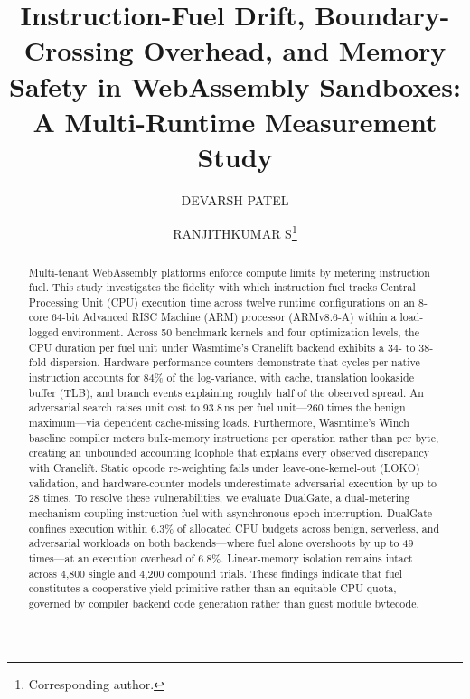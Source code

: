 \documentclass{ws-jcsc}
\begin{document}

\catchline{}{}{}{}{}

\title{Instruction-Fuel Drift, Boundary-Crossing Overhead, and Memory Safety in WebAssembly Sandboxes: A Multi-Runtime Measurement Study}

\author{DEVARSH PATEL}
\address{School of Computer Science and Engineering (SCOPE), Vellore Institute of Technology (VIT)\
Vellore, Tamil Nadu, 632014, India\
}

\author{RANJITHKUMAR S\footnote{Corresponding author.}}
\address{School of Computer Science and Engineering (SCOPE), Vellore Institute of Technology (VIT)\
Vellore, Tamil Nadu, 632014, India\
}

\maketitle

\begin{history}
\end{history}

\begin{abstract}
Multi-tenant WebAssembly platforms enforce compute limits by metering instruction fuel. This study investigates the fidelity with which instruction fuel tracks Central Processing Unit (CPU) execution time across twelve runtime configurations on an 8-core 64-bit Advanced RISC Machine (ARM) processor (ARMv8.6-A) within a load-logged environment. Across 50 benchmark kernels and four optimization levels, the CPU duration per fuel unit under Wasmtime's Cranelift backend exhibits a 34- to 38-fold dispersion. Hardware performance counters demonstrate that cycles per native instruction accounts for 84\% of the log-variance, with cache, translation lookaside buffer (TLB), and branch events explaining roughly half of the observed spread. An adversarial search raises unit cost to 93.8\,ns per fuel unit---260 times the benign maximum---via dependent cache-missing loads. Furthermore, Wasmtime's Winch baseline compiler meters bulk-memory instructions per operation rather than per byte, creating an unbounded accounting loophole that explains every observed discrepancy with Cranelift. Static opcode re-weighting fails under leave-one-kernel-out (LOKO) validation, and hardware-counter models underestimate adversarial execution by up to 28 times. To resolve these vulnerabilities, we evaluate DualGate, a dual-metering mechanism coupling instruction fuel with asynchronous epoch interruption. DualGate confines execution within 6.3\% of allocated CPU budgets across benign, serverless, and adversarial workloads on both backends---where fuel alone overshoots by up to 49 times---at an execution overhead of 6.8\%. Linear-memory isolation remains intact across 4{,}800 single and 4{,}200 compound trials. These findings indicate that fuel constitutes a cooperative yield primitive rather than an equitable CPU quota, governed by compiler backend code generation rather than guest module bytecode.
\end{abstract}
\end{document}

